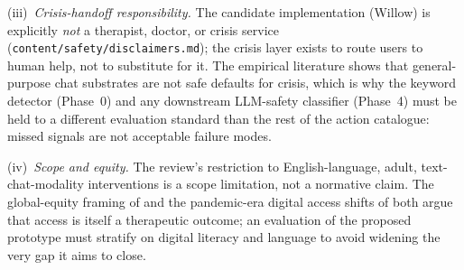 \documentclass[10pt,conference]{article}
\begin{document}
(iii)~\emph{Crisis-handoff responsibility.} The candidate
implementation (Willow) is explicitly \emph{not} a therapist, doctor,
or crisis service (\texttt{content/safety/disclaimers.md}); the
crisis layer exists to route users to human help, not to substitute
for it. The empirical
literature
\cite{DeFreitas2024ChatbotSafety,Scholich2025TherapistVsChatbot}
shows that general-purpose chat substrates are not safe defaults for
crisis, which is why the keyword detector (Phase~0) and any
downstream LLM-safety classifier (Phase~4) must be held to a
different evaluation standard than the rest of the action catalogue:
missed signals are not acceptable failure modes.

(iv)~\emph{Scope and equity.} The review's restriction to
English-language, adult, text-chat-modality interventions is a
scope limitation, not a normative claim. The global-equity framing
of \cite{vanHeerden2023LLMGlobalMH} and the pandemic-era digital
access shifts of \cite{MartinezMartin2020COVIDDigitalMHEthics} both
argue that access is itself a therapeutic outcome; an evaluation of
the proposed prototype must stratify on digital literacy and
language to avoid widening the very gap it aims to close.

\printbibliography[heading=bibnumbered,title={REFERENCES}]
\end{document}
